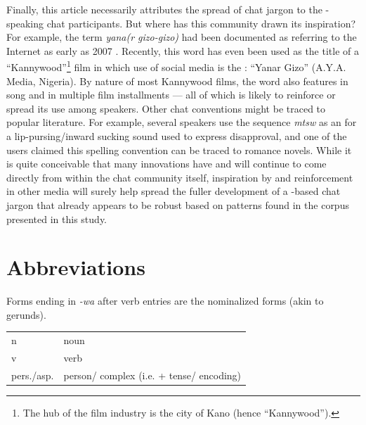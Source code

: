 \documentclass[output=paper,newtxmath,modfonts,nonflat,hidelinks]{langsci/langscibook}
\begin{document}
Finally, this article necessarily attributes the spread of  chat jargon to the -speaking chat participants. But where has this community drawn its inspiration? For example, the term \textit{yana(r gizo-gizo)} had been documented as referring to the Internet as early as 2007 \citep{newman2007}. Recently, this word has even been used as the title of a “Kannywood”\footnote{The hub of the  film industry is the city of Kano (hence “Kannywood”).} film in which use of social media is the : “Yanar Gizo” (A.Y.A. Media, Nigeria). By nature of most Kannywood films, the word also features in song and in multiple film installments — all of which is likely to reinforce or spread its use among  speakers. Other chat conventions might be traced to popular  literature. For example, several speakers use the sequence \textit{mtsw} as an  for a lip-pursing/inward sucking sound used to express disapproval, and one of the users claimed this spelling convention can be traced to  romance novels. While it is quite conceivable that many innovations have and will continue to come directly from within the chat community itself, inspiration by and reinforcement in other media will surely help spread the fuller development of a -based chat jargon that already appears to be robust based on patterns found in the corpus presented in this study. 

\section*{Abbreviations}
Forms ending in \textit{{}-wa} after verb entries are the nominalized forms (akin to gerunds).

\noindent\begin{tabularx}{\textwidth}{@{}lQ@{}}
n & noun\\
v & verb\\ 
pers./asp.& person/ complex (i.e.  + tense/ encoding)
\end{tabularx}
\end{document}
